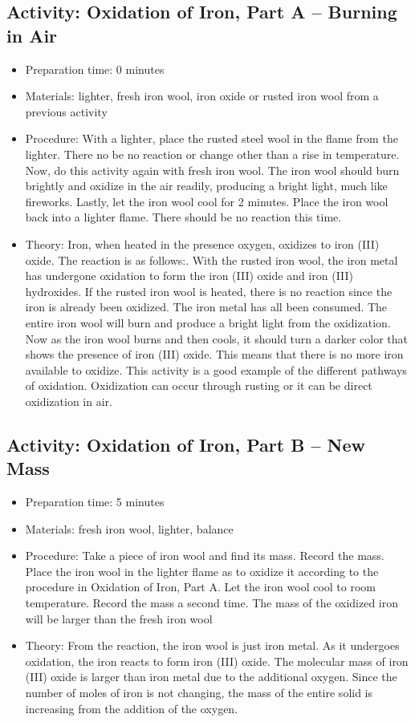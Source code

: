 \begin{itemize}
{\subsection{Activity: Oxidation of Iron, Part A – Burning in Air}
\begin{itemize}
\item{Preparation time: 0 minutes}
\item{Materials: lighter, fresh iron wool, iron oxide or rusted iron wool from a previous activity}
\item{Procedure: With a lighter, place the rusted steel wool in the flame from the lighter. There no be no reaction or change other than a rise in temperature. Now, do this activity again with fresh iron wool. The iron wool should burn brightly and oxidize in the air readily, producing a bright light, much like fireworks. Lastly, let the iron wool cool for 2 minutes. Place the iron wool back into a lighter flame. There should be no reaction this time.}
\item{Theory: Iron, when heated in the presence oxygen, oxidizes to iron (III) oxide. The reaction is as follows:. With the rusted iron wool, the iron metal has undergone oxidation to form the iron (III) oxide and iron (III) hydroxides. If the rusted iron wool is heated, there is no reaction since the iron is already been oxidized. The iron metal has all been consumed. The entire iron wool will burn and produce a bright light from the oxidization. Now as the iron wool burns and then cools, it should turn a darker color that shows the presence of iron (III) oxide. This means that there is no more iron available to oxidize. This activity is a good example of the different pathways of oxidation. Oxidization can occur through rusting or it can be direct oxidization in air. }
\end{itemize}

\subsection{Activity: Oxidation of Iron, Part B – New Mass}
\begin{itemize}
\item{Preparation time: 5 minutes}
\item{Materials: fresh iron wool, lighter, balance}
\item{Procedure: Take a piece of iron wool and find its mass. Record the mass. Place the iron wool in the lighter flame as to oxidize it according to the procedure in Oxidation of Iron, Part A. Let the iron wool cool to room temperature. Record the mass a second time. The mass of the oxidized iron will be larger than the fresh iron wool}
\item{Theory: From the reaction, the iron wool is just iron metal. As it undergoes oxidation, the iron reacts to form iron (III) oxide. The molecular mass of iron (III) oxide is larger than iron metal due to the additional oxygen. Since the number of moles of iron is not changing, the mass of the entire solid is increasing from the addition of the oxygen.}
\end{itemize}

}
\end{itemize}
